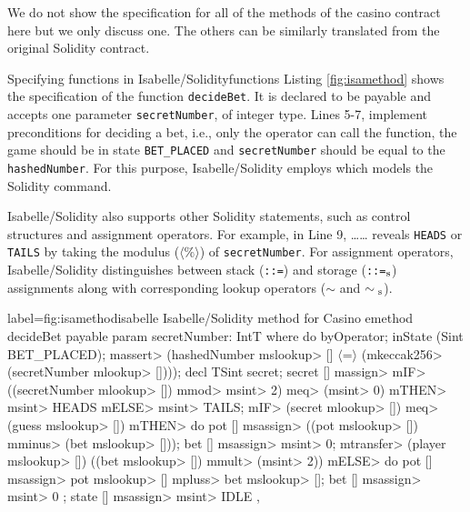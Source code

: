 \documentclass[a4paper,UKenglish,cleveref, autoref, thm-restate]{oasics-v2021}
\begin{document}
We do not show the specification for all of the methods of the casino contract here but we only discuss one.
The others can be similarly translated from the original Solidity contract.

\begin{Example}{Specifying functions in Isabelle/Solidity}{functions}
Listing \ref{fig:isamethod} shows the specification of the function \texttt{decideBet}.
It is declared to be payable and accepts one parameter \texttt{secretNumber}, of integer type.
Lines 5-7, implement preconditions for deciding a bet, i.e., only the operator can call the function, the game should be in state \texttt{BET\_PLACED} and \texttt{secretNumber} should be equal to the \texttt{hashedNumber}. 
For this purpose, Isabelle/Solidity employs \texttt{\color{isarblue}{assert}} which models the Solidity \texttt{\color{blue}{require}} command. 

Isabelle/Solidity also supports other Solidity statements, such as control structures and assignment operators.
For example, in Line 9, \texttt{\color{isarblue}{IF}}\dots \texttt{\color{isarblue}{THEN}}\dots \texttt{\color{isarblue}{ELSE}} reveals \texttt{HEADS} or \texttt{TAILS} by taking the modulus (\texttt{$\langle\%\rangle$}) of \texttt{secretNumber}. 
For assignment operators, Isabelle/Solidity distinguishes between stack (\texttt{::=}) and storage (\texttt{::=}$\textsubscript{s}$) assignments along with corresponding lookup operators ($\sim$ and $\sim\textsubscript{s}$). 

\begin{code}{label={fig:isamethod}}{isabelle}{%
  Isabelle/Solidity method for Casino%
  \hfill{}%
}
emethod decideBet payable
  param secretNumber: IntT
where
  do {
    byOperator;
    inState (Sint BET_PLACED);
    \<massert> (hashedNumber \<mslookup> [] $\langle$=$\rangle$ (\<mkeccak256> (secretNumber \<mlookup> [])));
    decl TSint secret;
    secret [] \<massign> \<mIF> ((secretNumber \<mlookup> []) \<mmod> \<msint> 2) \<meq> (\<msint> 0) 
    				        \<mTHEN> \<msint> HEADS \<mELSE> \<msint> TAILS;
    \<mIF> (secret \<mlookup> []) \<meq> (guess \<mslookup> []) \<mTHEN>
      do {
        pot [] \<msassign> ((pot \<mslookup> []) \<mminus> (bet \<mslookup> []));
        bet [] \<msassign> \<msint> 0;
        \<mtransfer> (player \<mslookup> []) ((bet \<mslookup> []) \<mmult> (\<msint> 2))
      }
    \<mELSE>
      do {
        pot [] \<msassign> pot \<mslookup> [] \<mpluss> bet \<mslookup> [];
        bet [] \<msassign> \<msint> 0
      };
    state [] \<msassign> \<msint> IDLE
  },
\end{code}
\end{Example}
\end{document}
